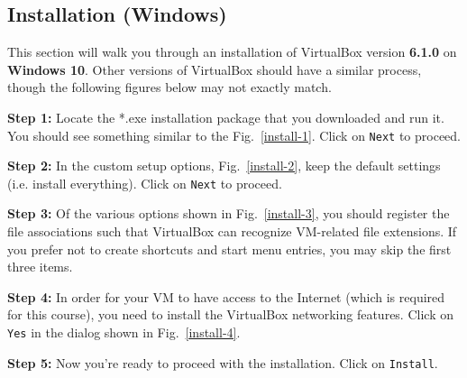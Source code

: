 \documentclass[11pt]{article}
\begin{document}
\subsection{Installation (Windows)}
\label{subsec:install-windows}
This section will walk you through an installation of VirtualBox version \textbf{6.1.0} on \textbf{Windows 10}. Other versions of VirtualBox should have a similar process, though the following figures below may not exactly match.

\textbf{Step 1:} Locate the *.exe installation package that you downloaded and run it. You should see something similar to the Fig.~\ref{install-1}. Click on \texttt{Next} to proceed.

\textbf{Step 2:} In the custom setup options, Fig.~\ref{install-2}, keep the default settings (i.e. install everything). Click on \texttt{Next} to proceed.

\textbf{Step 3:} Of the various options shown in Fig.~\ref{install-3}, you should register the file associations such that VirtualBox can recognize VM-related file extensions. If you prefer not to create shortcuts and start menu entries, you may skip the first three items.

\textbf{Step 4:} In order for your VM to have access to the Internet (which is required for this course), you need to install the VirtualBox networking features. Click on \texttt{Yes} in the dialog shown in Fig.~\ref{install-4}.


\textbf{Step 5:} Now you're ready to proceed with the installation. Click on \texttt{Install}.
\end{document}
